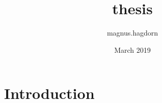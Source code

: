 \documentclass{article}
\title{thesis}
\author{magnus.hagdorn }
\date{March 2019}
\begin{document}
\maketitle

\section{Introduction}
\end{document}

